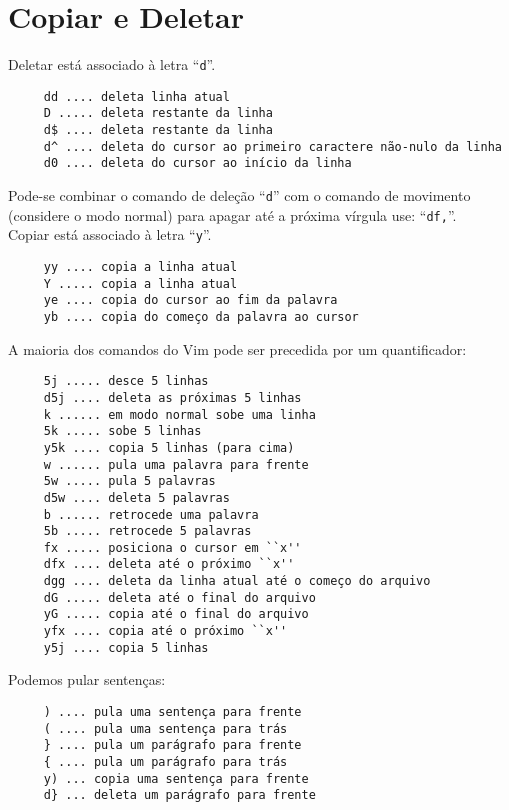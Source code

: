 \section{Copiar e Deletar}\label{sec:Copiar e Deletar}

Deletar está associado à letra ``\verb|d|''.

\begin{verbatim}
     dd .... deleta linha atual
     D ..... deleta restante da linha
     d$ .... deleta restante da linha
     d^ .... deleta do cursor ao primeiro caractere não-nulo da linha
     d0 .... deleta do cursor ao início da linha
\end{verbatim}


{\Large {}} Pode-se combinar o comando de deleção ``\verb+d+'' com o
comando de movimento (considere o modo normal) para apagar até a
próxima vírgula use: ``\verb+df,+''. \\


Copiar está associado à letra ``\verb|y|''.

\begin{verbatim}
     yy .... copia a linha atual
     Y ..... copia a linha atual
     ye .... copia do cursor ao fim da palavra
     yb .... copia do começo da palavra ao cursor
\end{verbatim}

A maioria dos comandos do Vim pode ser precedida por um quantificador:

\begin{verbatim}
     5j ..... desce 5 linhas
     d5j .... deleta as próximas 5 linhas
     k ...... em modo normal sobe uma linha
     5k ..... sobe 5 linhas
     y5k .... copia 5 linhas (para cima)
     w ...... pula uma palavra para frente
     5w ..... pula 5 palavras
     d5w .... deleta 5 palavras
     b ...... retrocede uma palavra
     5b ..... retrocede 5 palavras
     fx ..... posiciona o cursor em ``x''
     dfx .... deleta até o próximo ``x''
     dgg .... deleta da linha atual até o começo do arquivo
     dG ..... deleta até o final do arquivo
     yG ..... copia até o final do arquivo
     yfx .... copia até o próximo ``x''
     y5j .... copia 5 linhas
\end{verbatim}

Podemos pular sentenças:

\begin{verbatim}
     ) .... pula uma sentença para frente
     ( .... pula uma sentença para trás
     } .... pula um parágrafo para frente
     { .... pula um parágrafo para trás
     y) ... copia uma sentença para frente
     d} ... deleta um parágrafo para frente
\end{verbatim}

